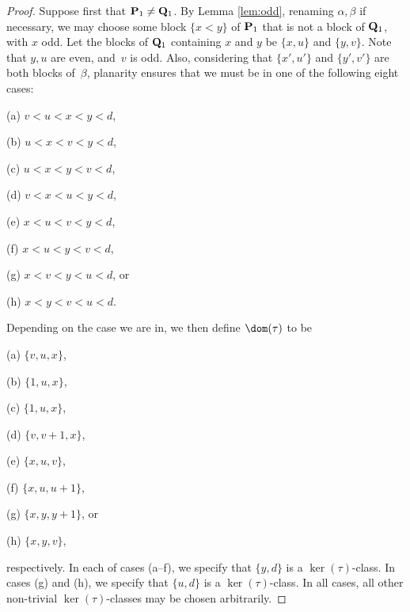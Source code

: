 \begin{proof}
\bigskip{}  Suppose first that ${\bf P}_1\not={\bf Q}_1$.  By Lemma \ref{lem:odd}, renaming $\alpha,\beta$ if necessary, we may choose some block $\{x<y\}$ of ${\bf P}_1$ that is not a block of ${\bf Q}_1$, with $x$ odd.  Let the blocks of ${\bf Q}_1$ containing $x$ and $y$ be $\{x,u\}$ and $\{y,v\}$.  Note that $y,u$ are even, and~$v$ is odd.
%
Also, considering that $\{x',u'\}$ and $\{y',v'\}$ are both blocks of~$\beta$, planarity ensures that we must be in one of the following eight cases:
\begin{itemize}
\begin{multicols}{4}
\item[(a)] $v<u<x<y<d$,
\item[(b)] $u<x<v<y<d$,
\item[(c)] $u<x<y<v<d$,
\item[(d)] $v<x<u<y<d$,
\item[(e)] $x<u<v<y<d$,
\item[(f)] $x<u<y<v<d$,
\item[(g)] $x<v<y<u<d$, or
\item[(h)] $x<y<v<u<d$.
\end{multicols}
\end{itemize}
Depending on the case we are in, we then define $\dom(\tau)$ to be
\begin{itemize}
\begin{multicols}{4}
\item[(a)] $\{v,u,x\}$,
\item[(b)] $\{1,u,x\}$,
\item[(c)] $\{1,u,x\}$,
\item[(d)] $\{v,v+1,x\}$,
\item[(e)] $\{x,u,v\}$,
\item[(f)] $\{x,u,u+1\}$,
\item[(g)] $\{x,y,y+1\}$, or
\item[(h)] $\{x,y,v\}$,
\end{multicols}
\end{itemize}
respectively.
%
In each of cases (a--f), we specify that $\{y,d\}$ is a $\ker(\tau)$-class.  In cases (g) and (h), we specify that $\{u,d\}$ is a $\ker(\tau)$-class.  In all cases, all other non-trivial $\ker(\tau)$-classes may be chosen arbitrarily.
%

\end{proof}

